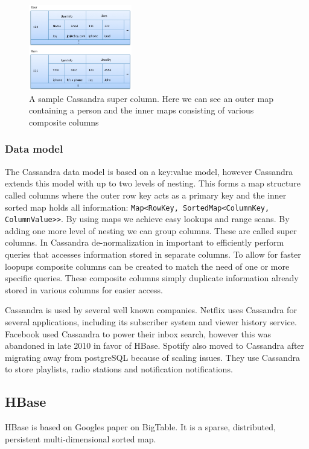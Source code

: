 \begin{figure}[h]
	\centering
	\includegraphics[width=0.4\textwidth]{background/figures/cas_super_col.png}
	\caption{A sample Cassandra super column. Here we can see an outer map containing a person and the inner maps consisting of various composite columns}
	\label{fig:sample_super_col}
\end{figure}

\subsubsection{Data model}
The Cassandra data model is based on a key:value model, however Cassandra extends this model with up to two levels of nesting. This forms a map structure called columns where the outer row key acts as a primary key and the inner sorted map holds all information: \texttt{Map<RowKey, SortedMap<ColumnKey, ColumnValue>>}. By using maps we achieve easy lookups and range scans. By adding one more level of nesting we can group columns. These are called super columns. 
In Cassandra de-normalization in important to efficiently perform queries that accesses information stored in separate columns. To allow for faster loopups composite columns can be created to match the need of one or more specific queries. These composite columns simply duplicate information already stored in various columns for easier access. 


Cassandra is used by several well known companies. Netflix uses Cassandra for several applications, including its subscriber system and viewer history service. Facebook used Cassandra to power their inbox search, however this was abandoned in late 2010 in favor of HBase. Spotify also moved to Cassandra after migrating away from postgreSQL because of scaling issues. They use Cassandra to store playlists, radio stations and notification notifications.

\subsection{HBase}
HBase is based on Googles paper on BigTable.
It is a sparse, distributed, persistent multi-dimensional sorted map.

